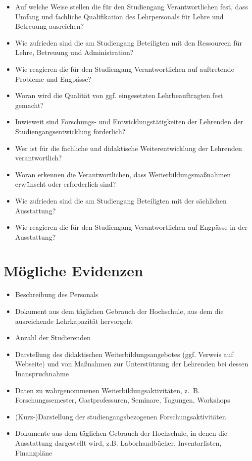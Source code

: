 \begin{itemize}
\item
  Auf welche Weise stellen die für den Studiengang Verantwortlichen
  fest, dass Umfang und fachliche Qualifikation des Lehrpersonals für
  Lehre und Betreuung ausreichen?
\item
  Wie zufrieden sind die am Studiengang Beteiligten mit den Ressourcen
  für Lehre, Betreuung und Administration?
\item
  Wie reagieren die für den Studiengang Verantwortlichen auf auftretende
  Probleme und Engpässe?
\item
  Woran wird die Qualität von ggf. eingesetzten Lehrbeauftragten fest
  gemacht?
\item
  Inwieweit sind Forschungs- und Entwicklungstätigkeiten der Lehrenden
  der Studiengangsentwicklung förderlich?
\item
  Wer ist für die fachliche und didaktische Weiterentwicklung der
  Lehrenden verantwortlich?
\item
  Woran erkennen die Verantwortlichen, dass Weiterbildungsmaßnahmen
  erwünscht oder erforderlich sind?
\item
  Wie zufrieden sind die am Studiengang Beteiligten mit der sächlichen
  Ausstattung?
\item
  Wie reagieren die für den Studiengang Verantwortlichen auf Engpässe in
  der Ausstattung?
\end{itemize}

\section{Mögliche Evidenzen}\label{muxf6gliche-evidenzen}

\begin{itemize}
\item
  Beschreibung des Personals
\item
  Dokument aus dem täglichen Gebrauch der Hochschule, aus dem die
  ausreichende Lehrkapazität hervorgeht
\item
  Anzahl der Studierenden
\item
  Darstellung des didaktischen Weiterbildungsangebotes (ggf. Verweis auf
  Webseite) und von Maßnahmen zur Unterstützung der Lehrenden bei dessen
  Inanspruchnahme
\item
  Daten zu wahrgenommenen Weiterbildungsaktivitäten, z.~B.
  Forschungssemester, Gastprofessuren, Seminare, Tagungen, Workshops
\item
  (Kurz-)Darstellung der studiengangsbezogenen Forschungsaktivitäten
\item
  Dokumente aus dem täglichen Gebrauch der Hochschule, in denen die
  Ausstattung dargestellt wird, z.B. Laborhandbücher, Inventarlisten,
  Finanzpläne
\end{itemize}

